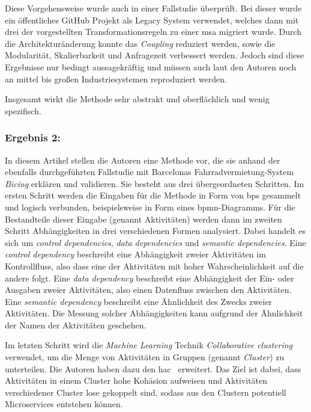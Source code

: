 Diese Vorgehensweise wurde auch in einer Fallstudie überprüft.
Bei dieser wurde ein öffentliches GitHub Projekt als Legacy System verwendet, welches dann mit drei der vorgestellten Transformationsregeln zu einer \gls{msa} migriert wurde.
Durch die Architekturänderung konnte das \emph{Coupling} reduziert werden, sowie die Modularität, Skalierbarkeit und Anfragezeit verbessert werden.
Jedoch sind diese Ergebnisse nur bedingt aussagekräftig und müssen auch laut den Autoren noch an mittel bis großen Industriesystemen reproduziert werden.

Insgesamt wirkt die Methode sehr abstrakt und oberflächlich und wenig spezifisch.

\subsubsection{Ergebnis 2: }

In diesem Artikel stellen die Autoren eine Methode vor, die sie anhand der ebenfalls durchgeführten Fallstudie mit Barcelonas Fahrradvermietung-System \emph{Bicing} erklären und validieren.
Sie besteht aus drei übergeordneten Schritten.
Im ersten Schritt werden die Eingaben für die Methode in Form von \glspl{bp} gesammelt und logisch verbunden, beispielsweise in Form eines \gls{bpmn}-Diagramms.
Für die Bestandteile dieser Eingabe (genannt Aktivitäten) werden dann im zweiten Schritt Abhängigkeiten in drei verschiedenen Formen analysiert.
Dabei handelt es sich um \emph{control dependencies}, \emph{data dependencies} und \emph{semantic dependencies}.
Eine \emph{control dependency} beschreibt eine Abhängigkeit zweier Aktivitäten im Kontrollfluss, also dass eine der Aktivitäten mit hoher Wahrscheinlichkeit auf die andere folgt.
Eine \emph{data dependency} beschreibt eine Abhängigkeit der Ein- oder Ausgaben zweier Aktivitäten, also einen Datenfluss zwischen den Aktivitäten.
Eine \emph{semantic dependency} beschreibt eine Ähnlichkeit des Zwecks zweier Aktivitäten. 
Die Messung solcher Abhängigkeiten kann aufgrund der Ähnlichkeit der Namen der Aktivitäten geschehen.

Im letzten Schritt wird die \emph{Machine Learning} Technik \emph{Collaborative clustering} verwendet, um die Menge von Aktivitäten in Gruppen (genannt \emph{Cluster}) zu unterteilen.
Die Autoren haben dazu den \gls{hac}~\cite{hierarchical-agglomerative-algorithm} erweitert.
Das Ziel ist dabei, dass Aktivitäten in einem Cluster hohe Kohäsion aufweisen und Aktivitäten verschiedener Cluster lose gekoppelt sind, sodass aus den Clustern potentiell Microservices entstehen können.

